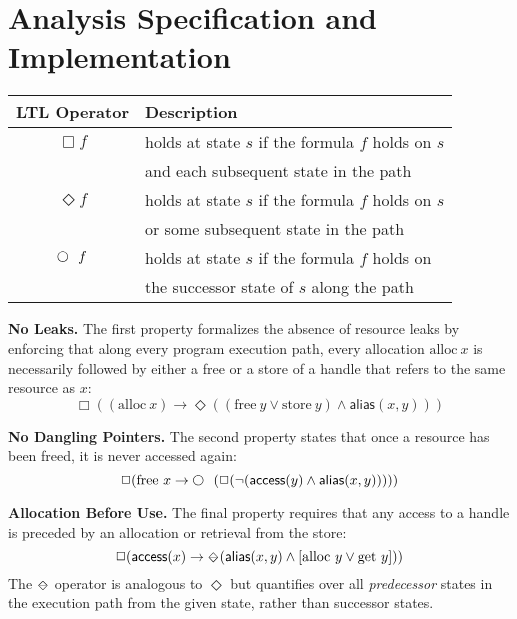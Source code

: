 \documentclass[12pt]{article}
\def\Next{\hspace{4pt}\raise 3pt \hbox{\circle{7}} \hspace{4pt} }
\newcommand{\dia}{{\raisebox{-0.2ex}{$\Diamond$}}}
\newcommand{\PastDiamond}                                     %
     {\mbox{\rm\makebox[0em][l]{$\dia$}\makebox[0.8em]{--}\hspace{0.05em}}}
\def\access{{\mathsf{access}}}
\def\alias{{\mathsf{alias}}}
\begin{document}
\section{Analysis Specification and Implementation}
\label{sec:alg}

\centering
\begin{tabular}{| c | l |}

    \hline 

    \textbf{LTL Operator} & \textbf{Description} \\

    \hline

    $\Box f$ & holds at state $s$ if the formula $f$ holds on $s$ \\
             & and each subsequent state in the path \\

    \hline

    $\Diamond f$ & holds at state $s$ if the formula $f$ holds on $s$ \\
                 & or some subsequent state in the path \\

    \hline

    $\Next f$ & holds at state $s$ if the formula $f$ holds on \\
              & the successor state of $s$ along the path \\

    \hline 
\end{tabular}

\vspace{1in}


\smallskip
\noindent
{\bf No Leaks.} The first property formalizes the absence of resource
leaks by enforcing that along every program execution path, every allocation
$\mathrm{alloc}\ x$ is necessarily followed by either
a free or a store of a handle
that refers to the same resource as $x$:
\[
\Box \left( (\mathrm{alloc}\ x) \rightarrow
	\Diamond \left( (\mathrm{free}\ y 
                              \vee
                        \mathrm{store}\ y) \wedge \alias(x,y) 
                 \right) \right)
\]

\smallskip\noindent
{\bf No Dangling Pointers.} The second
property states that once a resource has
been freed, it is never accessed again:
\[
\Box ( \mathrm{free}\ x \rightarrow \Next (\Box (\lnot (\access(y) \wedge \alias(x,y))))) 
\]

\smallskip\noindent
{\bf Allocation Before Use.}
The final property requires that any access to a handle is preceded by 
an allocation or retrieval from the store:
\[
\Box (\access(x) \rightarrow \PastDiamond (\alias(x,y) \wedge 
	\left[ \mathrm{alloc}\ y \vee \mathrm{get}\ y \right] ) )
\]
The $\PastDiamond$ operator is analogous to $\Diamond$ but quantifies
over all {\em predecessor} states in the execution path from the given
state, rather than successor states.
\end{document}
